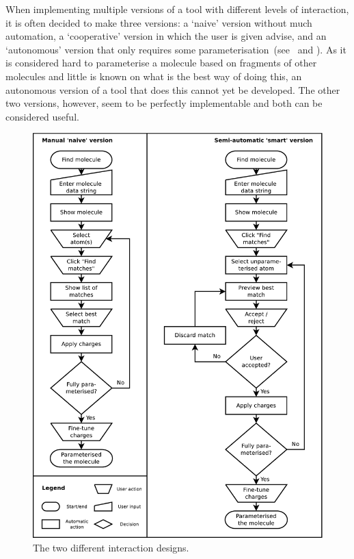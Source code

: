 When implementing multiple versions of a tool with different levels of interaction, it is often decided to make three versions: a `naive' version without much automation, a `cooperative' version in which the user is given advise, and an `autonomous' version that only requires some parameterisation~(see~\cite{payne2000varying} and ). As it is considered hard to parameterise a molecule based on fragments of other molecules and little is known on what is the best way of doing this, an autonomous version of a tool that does this cannot yet be developed. The other two versions, however, seem to be perfectly implementable and both can be considered useful.

\begin{figure}[h!]
\begin{center}
\includegraphics[width=.9\textwidth]{img/complete_id.pdf}
\caption{The two different interaction designs.}
\end{center}
\end{figure}

